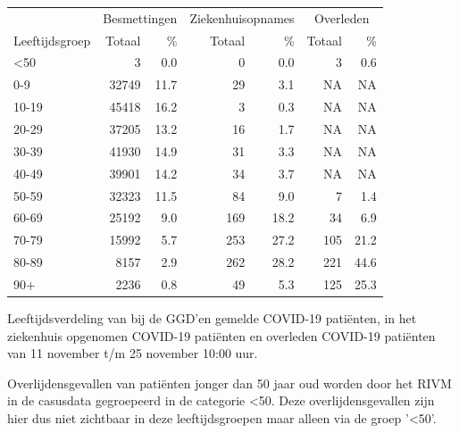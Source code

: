 \documentclass[
  english,
  man,floatsintext]{apa6}
\begin{document}
\begin{table}
\centering\begingroup\fontsize{11}{13}\selectfont

\begin{threeparttable}
\begin{tabular}{lrrrrrr}
\toprule
\multicolumn{1}{c}{ } & \multicolumn{2}{c}{Besmettingen} & \multicolumn{2}{c}{Ziekenhuisopnames} & \multicolumn{2}{c}{Overleden} \\
\cmidrule(l{3pt}r{3pt}){2-3} \cmidrule(l{3pt}r{3pt}){4-5} \cmidrule(l{3pt}r{3pt}){6-7}
Leeftijdsgroep & Totaal & \% & Totaal & \% & Totaal & \%\\
\midrule
<50 & 3 & 0.0 & 0 & 0.0 & 3 & 0.6\\
0-9 & 32749 & 11.7 & 29 & 3.1 & NA & NA\\
10-19 & 45418 & 16.2 & 3 & 0.3 & NA & NA\\
20-29 & 37205 & 13.2 & 16 & 1.7 & NA & NA\\
30-39 & 41930 & 14.9 & 31 & 3.3 & NA & NA\\
40-49 & 39901 & 14.2 & 34 & 3.7 & NA & NA\\
50-59 & 32323 & 11.5 & 84 & 9.0 & 7 & 1.4\\
60-69 & 25192 & 9.0 & 169 & 18.2 & 34 & 6.9\\
70-79 & 15992 & 5.7 & 253 & 27.2 & 105 & 21.2\\
80-89 & 8157 & 2.9 & 262 & 28.2 & 221 & 44.6\\
90+ & 2236 & 0.8 & 49 & 5.3 & 125 & 25.3\\
\bottomrule
\end{tabular}
\begin{tablenotes}
\item[1] Leeftijdsverdeling van bij de GGD’en gemelde COVID-19 patiënten, in het ziekenhuis opgenomen COVID-19 patiënten en overleden COVID-19 patiënten van 11 november t/m 25 november 10:00 uur.
\item[2] Overlijdensgevallen van patiënten jonger dan 50 jaar oud worden door het RIVM in de casusdata gegroepeerd in de categorie <50. Deze overlijdensgevallen zijn hier dus niet zichtbaar in deze leeftijdsgroepen maar alleen via de groep '<50'.
\end{tablenotes}
\end{threeparttable}
\endgroup{}
\end{table}

\newpage
\end{document}
